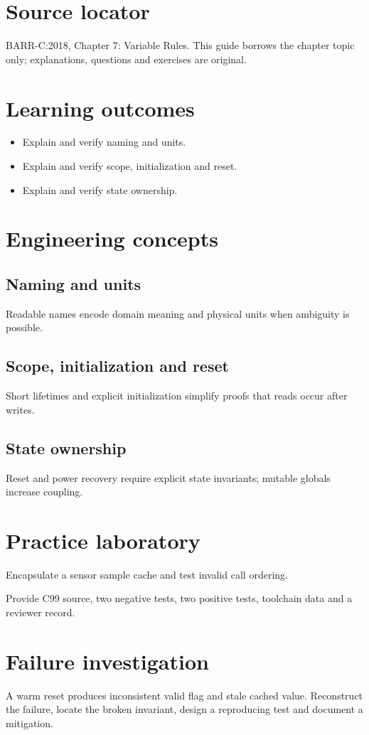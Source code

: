 \documentclass[10pt,letterpaper]{article}
\begin{document}
\makedoctitle
\makedocsummary
\section{Source locator}
BARR-C:2018, Chapter 7: Variable Rules. This guide borrows the chapter topic only; explanations, questions and exercises are original.
\section{Learning outcomes}
\begin{itemize}
\item Explain and verify naming and units.
\item Explain and verify scope, initialization and reset.
\item Explain and verify state ownership.
\end{itemize}

\section{Engineering concepts}
\subsection{Naming and units}
Readable names encode domain meaning and physical units when ambiguity is possible.

\subsection{Scope, initialization and reset}
Short lifetimes and explicit initialization simplify proofs that reads occur after writes.

\subsection{State ownership}
Reset and power recovery require explicit state invariants; mutable globals increase coupling.

\section{Practice laboratory}
Encapsulate a sensor sample cache and test invalid call ordering.

Provide C99 source, two negative tests, two positive tests, toolchain data and a reviewer record.
\section{Failure investigation}
A warm reset produces inconsistent valid flag and stale cached value. Reconstruct the failure, locate the broken invariant, design a reproducing test and document a mitigation.
\end{document}
